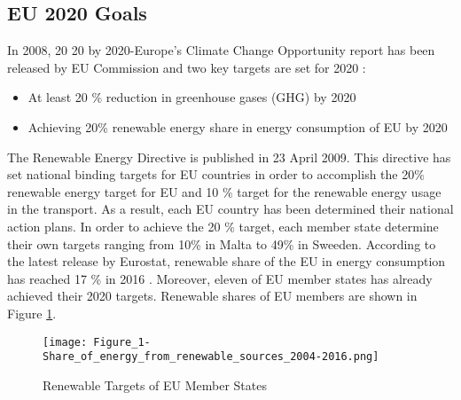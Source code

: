 \subsection{EU 2020 Goals}
In 2008, 20 20 by 2020-Europe's Climate Change Opportunity report has been released by EU Commission and two key targets are set for 2020 \cite{EuropeanCommission2008}: 
\begin{itemize}  
	\item At least 20 \% reduction in greenhouse gases (GHG) by 2020
	\item Achieving 20\% renewable energy share in energy consumption of EU by 2020
\end{itemize}
The Renewable Energy Directive is published in 23 April 2009. This directive has set national binding targets for EU countries in order to accomplish the 20\% renewable energy target for EU and 10 \% target for the renewable energy usage in the transport. \cite{EuropeanParliament2009} As a result, each EU country has been determined their national action plans. In order to achieve the 20 \% target, each member state determine their own targets ranging from 10\% in Malta to 49\% in Sweeden. According to the latest release by Eurostat, renewable share of the EU in energy consumption has reached 17 \% in 2016 \cite{States2016}. Moreover, eleven of EU member states has already achieved their 2020 targets. Renewable shares of EU members are shown in Figure \ref{EUtargets}.
\begin{figure}[h!]
	\centering
	\texttt{[image: Figure\_1-Share\_of\_energy\_from\_renewable\_sources\_2004-2016.png]}
	\caption{Renewable Targets of EU Member States\cite{States2016}}
	\label{EUtargets}
\end{figure}
